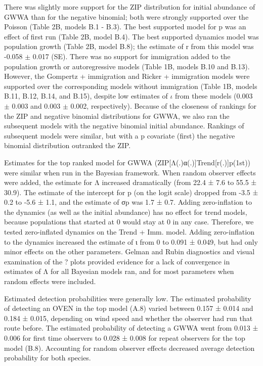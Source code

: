 \documentclass[12pt]{article}
\begin{document}
There was slightly more support for the ZIP distribution for initial
abundance of GWWA than for the negative binomial; both were strongly
supported over the Poisson (Table 2B, models B.1 - B.3).  The best
supported model for p was an effect of first run (Table 2B, model
B.4).  The best supported dynamics model was population growth (Table
2B, model B.8); the estimate of r from this model was -0.058 $\pm$ 0.017
(SE).  There was no support for immigration added to the population
growth or autoregressive models (Table 1B, models B.10 and B.13).
However, the Gompertz + immigration and Ricker + immigration models
were supported over the corresponding models without immigration
(Table 1B, models B.11, B.12, B.14, and B.15), despite low estimates
of $\iota$ from these models (0.003 $\pm$ 0.003 and 0.003 $\pm$ 0.002,
respectively).  %
Because of the closeness of rankings for the ZIP and negative binomial
distributions for GWWA, we also ran the subsequent models with the
negative binomial initial abundance.  Rankings of subsequent models
were similar, but with a p covariate (first) the negative binomial
distribution outranked the ZIP.

Estimates for the top ranked model for GWWA (ZIP[Λ(.)α(.)]Trend[r(.)]p(1st)) 
were similar when run in the Bayesian framework.  When random observer 
effects were added, the estimate for Λ  increased dramatically 
(from 22.4 ± 7.6 to 55.5 ± 30.9).  The estimate of the intercept for p (on the 
logit scale) dropped from -3.5 ± 0.2 to -5.6 ± 1.1, and the estimate of σp 
was 1.7 ± 0.7.  Adding zero-inflation to the dynamics (as well as the initial 
abundance) has no effect for trend models, because populations that started 
at 0 would stay at 0 in any case.  Therefore, we tested zero-inflated dynamics 
on the Trend + Imm. model.  Adding zero-inflation to the dynamics increased 
the estimate of ι from 0 to 0.091 ± 0.049, but had only minor effects on the 
other parameters.  Gelman and Rubin diagnostics and visual examination of 
the ? plots provided evidence for a lack of convergence in estimates of Λ 
for all Bayesian models ran, and for most parameters when random effects 
were included.

Estimated detection probabilities were generally low.  The estimated probability 
of detecting an OVEN in the top model (A.8) varied between 0.157 ± 0.014 
and 0.184 ± 0.015, depending on wind speed and whether the observer had 
run that route before.  The estimated probability of detecting a GWWA went 
from 0.013 ± 0.006 for first time observers to 0.028 ± 0.008 for repeat 
observers for the top model (B.8).  Accounting for random observer effects 
decreased average detection probability for both species.
\end{document}
